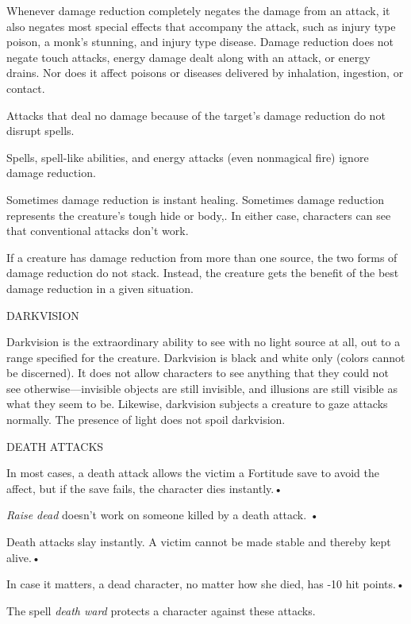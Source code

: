 \documentclass{article}
\begin{document}
Whenever damage reduction completely negates the damage from an attack, it also 
negates most special effects that accompany the attack, such as injury type poison, 
a monk's stunning, and injury type disease. Damage reduction does not negate touch 
attacks, energy damage dealt along with an attack, or energy drains. Nor does it 
affect poisons or diseases delivered by inhalation, ingestion, or contact. 

Attacks that deal no damage because of the target's damage reduction do not disrupt 
spells.

Spells, spell-like abilities, and energy attacks (even nonmagical fire) ignore 
damage reduction.

Sometimes damage reduction is instant healing. Sometimes damage reduction represents 
the creature's tough hide or body,. In either case, characters can see that conventional 
attacks don't work.

If a creature has damage reduction from more than one source, the two forms of 
damage reduction do not stack. Instead, the creature gets the benefit of the best 
damage reduction in a given situation. 

\vspace{12pt}
DARKVISION

Darkvision is the extraordinary ability to see with no light source at all, out 
to a range specified for the creature. Darkvision is black and white only (colors 
cannot be discerned). It does not allow characters to see anything that they could 
not see otherwise---invisible objects are still invisible, and illusions are still 
visible as what they seem to be. Likewise, darkvision subjects a creature to gaze 
attacks normally. The presence of light does not spoil darkvision.

\vspace{12pt}
DEATH ATTACKS

In most cases, a death attack allows the victim a Fortitude save to avoid the affect, 
but if the save fails, the character dies instantly.• 

\textit{Raise dead }doesn't work on someone killed by a death attack. • 

\parindent=3pt
Death attacks slay instantly. A victim cannot be made stable and thereby kept alive.• 

In case it matters, a dead character, no matter how she died, has -10 hit points.• 

\parindent=7pt
The spell \textit{death ward }protects a character against these attacks.
\end{document}
